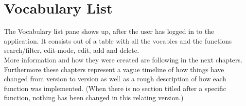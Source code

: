 \section{Vocabulary List}
The Vocabulary list pane shows up, after the user has logged in to the application.
It consists out of a table with all the vocables and the functions search/filter, edit-mode, edit, add and delete.\\ More information and how they were created are following in the next chapters. Furthermore these chapters represent a vague timeline of how things have changed from version to version as well as a rough description of how each function was implemented. (When there is no section titled after a specific function, nothing has been changed in this relating version.) 